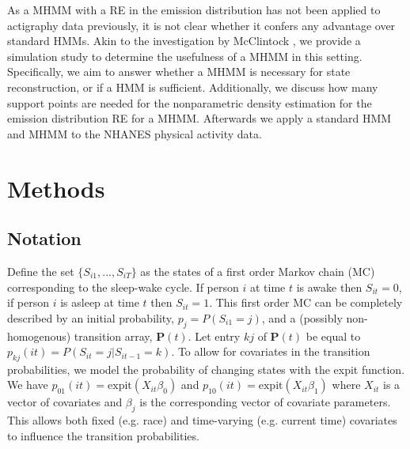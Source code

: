 \documentclass{article}
\begin{document}
As a MHMM with a RE in the emission distribution has not been applied to actigraphy data previously, it is not clear whether it confers any advantage over standard HMMs. Akin to the investigation by McClintock \cite{mcclintock2021}, we provide a simulation study to determine the usefulness of a MHMM in this setting. Specifically, we aim to answer whether a MHMM is necessary for state reconstruction, or if a HMM is sufficient. Additionally, we discuss how many support points are needed for the nonparametric density estimation for the emission distribution RE for a MHMM. Afterwards we apply a standard HMM and MHMM to the NHANES physical activity data.

\section{Methods} \label{Methods}
\subsection{Notation}

Define the set $\{S_{i1}, ..., S_{iT}\}$ as the states of a first order Markov chain (MC) corresponding to the sleep-wake cycle. If person $i$ at time $t$ is awake then $S_{it}=0$, if person $i$ is asleep at time $t$ then $S_{it}=1$. This first order MC can be completely described by an initial probability, $p_j=P(S_{i1} =j)$, and a (possibly non-homogenous) transition array, $\mathbf{P}(t)$.  Let entry $kj$ of $\mathbf{P}(t)$ be equal to $p_{kj}(it)=P(S_{it}=j|S_{it-1}=k)$. To allow for covariates in the transition probabilities, we model the probability of changing states with the expit function. We have $p_{01}(it) = \text{expit}(X_{it}\beta_0)$ and $p_{10}(it) = \text{expit}(X_{it}\beta_1)$ where $X_{it}$ is a vector of covariates and $\beta_j$ is the corresponding vector of covariate parameters. This allows both fixed (e.g. race) and time-varying (e.g. current time) covariates to influence the transition probabilities.
\end{document}
